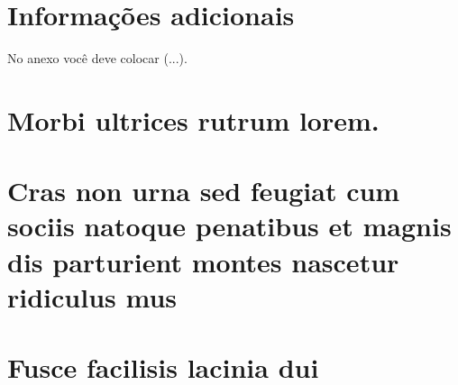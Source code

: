 \chapter{Informações adicionais}

No anexo você deve colocar (...).

\chapter{Morbi ultrices rutrum lorem.}
\lipsum[30]

\chapter{Cras non urna sed feugiat cum sociis natoque penatibus et magnis dis
	parturient montes nascetur ridiculus mus}

\lipsum[31]

\chapter{Fusce facilisis lacinia dui}

\lipsum[32]